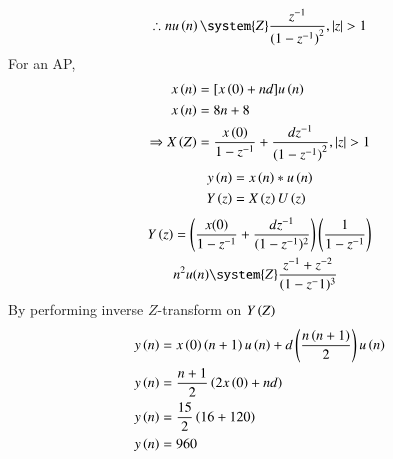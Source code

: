 \documentclass[journal,12pt,twocolumn]{IEEEtran}
\theoremstyle{remark}
\begin{document}
\begin{align}
    \therefore nu\brak{n} \system{Z} \dfrac{z^{-1}}{{(1-z^{-1})}^2}, |z|>1
\end{align}
For an AP,
\begin{align}
    x\brak n &=[ x\brak 0 + nd ]u\brak n    \\
    x\brak n&=8n+8  \\
    \Rightarrow X\brak Z &= \dfrac{x\brak 0}{1-z^{-1}} + \dfrac{dz^{-1}}{{(1-z^{-1})}^{2}}, |z|>1 
\end{align}
\begin{align}
    y\left(n\right)&=x\left(n\right)\ast u\left(n\right)\\
    Y\left(z\right)&=X\left(z\right)U\left(z\right)
\end{align}
\begin{align}
    Y\brak{z}&=\brak{\dfrac{x(0)}{1-z^{-1}} + \dfrac{dz^{-1}}{(1-z^{-1})^{2}}}\brak{\dfrac{1}{1-z^{-1}}}\\
    &n^2u(n)\system{Z} \dfrac{z^{-1}+z^{-2}}{(1-z^-1)^3}
 \end{align}
 By performing inverse $Z$-transform on $Y\left(Z\right)$
\begin{align}
    y\left(n\right)&=x\left(0\right)\left(n+1\right)u\left(n\right)+d\left(\dfrac{{n\left(n+1\right)}}{2}\right)u\left(n\right)   \\
    y\left(n\right)&=\dfrac{n+1}{2}\left(2x\left(0\right)+nd\right)   \\
    y\left(n\right) &= \dfrac{15}{2}\left(16+120\right)    \\
    y\left(n\right) &=960
 \end{align}

\end{document}
